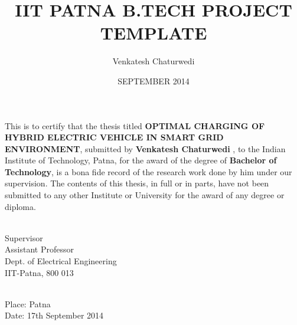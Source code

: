 \documentclass[BTech]{iitpdiss}
\begin{document}

\title{\uppercase{IIT Patna B.Tech Project Template}}

\author{Venkatesh Chaturwedi }
\date{SEPTEMBER 2014}

\maketitle

\certificate

\vspace*{0.5in}

\noindent This is to certify that the thesis titled {\bf OPTIMAL CHARGING OF HYBRID ELECTRIC VEHICLE IN SMART GRID ENVIRONMENT}, submitted by {\bf Venkatesh Chaturwedi }, 
  to the Indian Institute of Technology, Patna, for
the award of the degree of {\bf Bachelor of Technology}, is a bona fide
record of the research work done by him under our supervision.  The
contents of this thesis, in full or in parts, have not been submitted
to any other Institute or University for the award of any degree or
diploma.

\vspace*{1.5in}

\begin{singlespacing}
\hspace*{-0.25in}
\hfill 
\parbox{2.5in}{
 \\
\noindent Supervisor \\ 
\noindent Assistant Professor \\
\noindent Dept.  of  Electrical Engineering\\
\noindent IIT-Patna, 800 013 \\
}  
\end{singlespacing}
\vspace*{0.25in}
\\
\noindent Place: Patna\\
\noindent Date: 17th September 2014 
\end{document}
